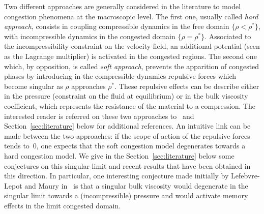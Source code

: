 \documentclass[JEP,XML,SOM,Unicode,NoEqCountersInSection]{cedram}
\newcommand{\<}{\bigl\langle}
\renewcommand{\>}{\bigr\rangle}
\theoremstyle{definition}
\theoremstyle{remark}
\begin{document}
Two different approaches are generally considered in the literature to model congestion phenomena at the macroscopic level.
The first one, usually called \emph{hard approach}, consists in coupling compressible dynamics in the free domain $\{\rho < \rho^*\}$, with incompressible dynamics in the congested domain $\{\rho = \rho^*\}$.
Associated to the incompressibility constraint on the velocity field, an additional potential (seen as the Lagrange multiplier) is activated in the congested regions.
The second one which, by opposition, is called \emph{soft approach}, prevents the apparition of congested phases by introducing in the compressible dynamics repulsive forces which become singular as $\rho$ approaches $\rho^*$.
These repulsive effects can be describe either in the pressure (constraint on the fluid at equilibrium) or in the bulk viscosity coefficient, which represents the resistance of the material to a compression.
The interested reader is referred on these two approaches to~\cite{maury2012} and Section~\ref{sec:literature} below for additional references.
An intuitive link can be made between the two approaches: if the scope of action of the repulsive forces tends to~$0$, one expects that the soft congestion model degenerates towards a hard congestion model.
We give in the Section~\ref{sec:literature} below some conjectures on this singular limit and recent results that have been obtained in this direction.
In particular, one interesting conjecture made initially by {Lefebvre-Lepot} and {Maury} in~\cite{lefebvre2011} is that a singular bulk viscosity would degenerate in the singular limit towards a (incompressible) pressure and would activate memory effects in the limit congested domain.
\end{document}

